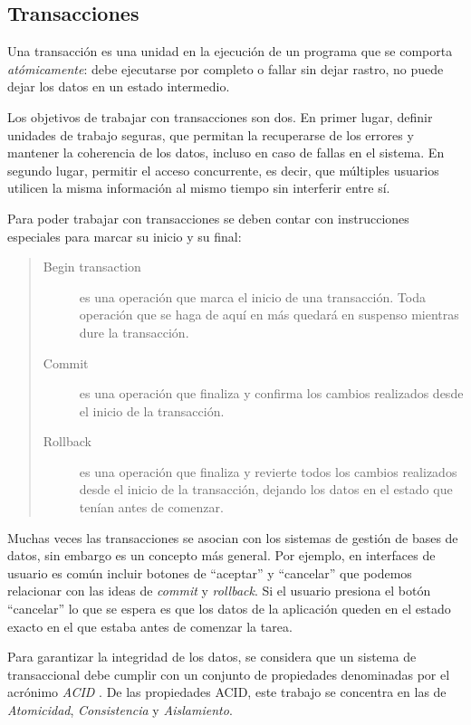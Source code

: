 \subsection{Transacciones}	

Una transacción es una unidad en la ejecución de un programa que se comporta 
\emph{atómicamente}: debe ejecutarse por completo o fallar sin dejar rastro, no
puede dejar los datos en un estado intermedio.

Los objetivos de trabajar con transacciones son dos.
En primer lugar, definir unidades de trabajo seguras, que permitan la
recuperarse de los errores y mantener la coherencia de los datos, incluso en caso de fallas en el sistema.
En segundo lugar, permitir el acceso concurrente, es decir, que múltiples
usuarios utilicen la misma información al mismo tiempo sin interferir entre sí.

\medskip
Para poder trabajar con transacciones se deben contar con instrucciones
especiales para marcar su inicio y su final:
\begin{quote}
	\label{ctxTransactional}
	\begin{description}
		\item[Begin transaction] es una operación que marca el inicio de una
		transacción. Toda operación que se haga de aquí en más quedará en suspenso
		mientras dure la transacción.
	
		\item[Commit] es una operación que finaliza y confirma los
		cambios realizados desde el inicio de la transacción. 
		
		\item[Rollback] es una operación que finaliza y revierte todos los cambios
		realizados desde el inicio de la transacción, 
		dejando los datos en el estado que tenían antes de comenzar.
	\end{description}
\end{quote}
   
\bigskip

Muchas veces las transacciones se asocian con los sistemas de gestión de bases
de datos, sin embargo es un concepto más general.
Por ejemplo, en interfaces de usuario es común incluir botones de
``aceptar'' y ``cancelar'' que podemos relacionar con las ideas de
\emph{commit} y \emph{rollback}. 
Si el usuario presiona el botón ``cancelar'' lo que se espera
es que los datos de la aplicación queden en el estado exacto en el que estaba
antes de comenzar la tarea.

\bigskip
\label{sec:ACID}
Para garantizar la integridad de los datos, se considera que un sistema de
transaccional debe cumplir con un conjunto de propiedades denominadas por el
acrónimo \emph{ACID} \cite{HaerderReuter83}.
De las propiedades ACID, este trabajo se concentra en las de \emph{Atomicidad},
\emph{Consistencia} y \emph{Aislamiento}. 

